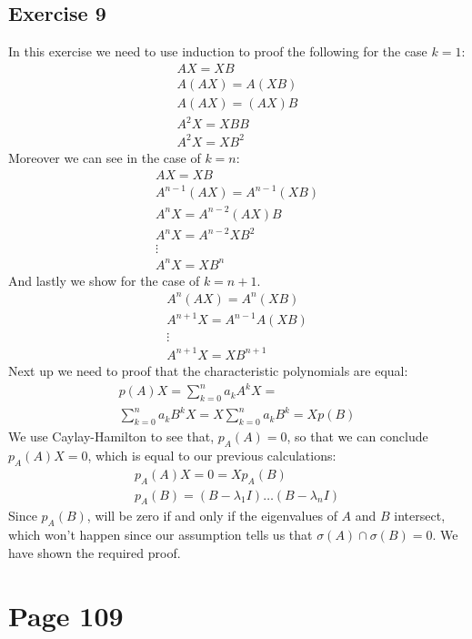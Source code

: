 \subsection{Exercise 9}
In this exercise we need to use induction to proof the following for the case $k=1$:
\begin{gather*}
AX = XB \\
A(AX) = A(XB) \\
A(AX) = (AX)B \\
A^2X = XBB\\
A^2X = XB^2
\end{gather*}
Moreover we can see in the case of $k=n$:
\begin{gather*}
AX = XB\\
A^{n-1}(AX) = A^{n-1}(XB)\\
A^nX = A^{n-2}(AX)B \\
A^nX = A^{n-2}XB^2\\
\vdots \\
A^nX = XB^{n}
\end{gather*}
And lastly we show for the case of $k=n+1$.
\begin{gather*}
A^n (AX) = A^{n}(XB)\\
A^{n+1}X = A^{n-1}A(XB)\\
\vdots \\
A^{n+1}X = XB^{n+1}
\end{gather*}
Next up we need to proof that the characteristic polynomials are equal:
\begin{gather*}
p(A)X = \sum_{k=0}^n a_k A^k X =\\
\sum_{k=0}^n a_k B^k X = X \sum_{k=0}^n a_k B^k = X p(B)
\end{gather*}
We use Caylay-Hamilton to see that, $p_A(A) = 0$, so that we can conclude $p_A(A) X = 0$, which is equal to our previous calculations:
\begin{gather*}
p_A(A)X =  0 = X p_A(B)\\
p_A(B) = (B - \lambda_1 I ) \ldots (B - \lambda_n I) 
\end{gather*}
Since $p_A(B)$, will be zero if and only if the eigenvalues of $A$ and $B$ intersect, which won't happen since our assumption tells us that $\sigma(A) \cap \sigma(B) = 0$.
We have shown the required proof.
\section{Page 109}

